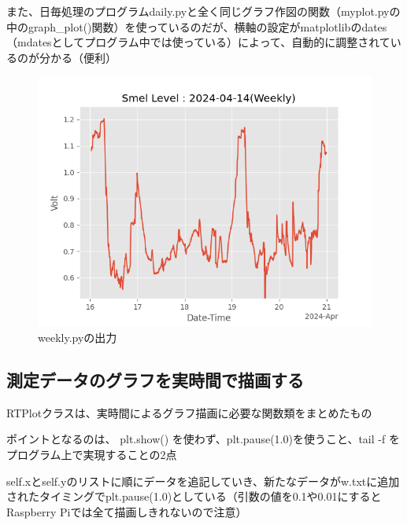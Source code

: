 \documentclass[12pt,a4paper,uplatex]{jsbook}
\begin{document}
また、日毎処理のプログラムdaily.pyと全く同じグラフ作図の関数（myplot.pyの中のgraph\_plot()関数）を使っているのだが、横軸の設定がmatplotlibのdates（mdatesとしてプログラム中では使っている）によって、自動的に調整されているのが分かる（便利）

\begin{figure}[htbp]
	\begin{minipage}[b]{1.0\linewidth}
		\centering
		\includegraphics[keepaspectratio, scale=0.8]{figs/png/Weekly_2024-04-14.png}
		\caption{weekly.pyの出力}
	\end{minipage}
\end{figure}


\subsection{測定データのグラフを実時間で描画する}

	RTPlotクラスは、実時間によるグラフ描画に必要な関数類をまとめたもの
	
	ポイントとなるのは、 plt.show() を使わず、plt.pause(1.0)を使うこと、tail -f をプログラム上で実現することの2点
	
	self.xとself.yのリストに順にデータを追記していき、新たなデータがw.txtに追加されたタイミングでplt.pause(1.0)としている（引数の値を0.1や0.01にするとRaspberry Piでは全て描画しきれないので注意）
	
\end{document}
